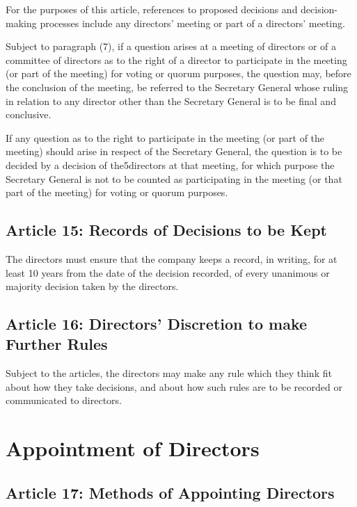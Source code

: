 \documentclass[letterpaper,10pt,openany,oneside,english]{sphinxmanual}
\begin{document}
 For the purposes of this article, references to proposed decisions and decision-making processes include any directors’ meeting or part of a directors’ meeting.

 Subject to paragraph (7), if a question arises at a meeting of directors or of a committee of directors as to the right of a director to participate in the meeting (or part of the meeting) for voting or quorum purposes, the question may, before the conclusion of the meeting, be referred to the Secretary General whose ruling in relation to any director other than the Secretary General is to be final and conclusive.

 If any question as to the right to participate in the meeting (or part of the meeting) should arise in respect of the Secretary General, the question is to be decided by a decision of the5directors at that meeting, for which purpose the Secretary General is not to be counted as participating in the meeting (or that part of the meeting) for voting or quorum purposes.


\subsection{Article 15: Records of Decisions to be Kept}
\label{\detokenize{directors:article-15-records-of-decisions-to-be-kept}}\label{\detokenize{directors:article-15}}
The directors must ensure that the company keeps a record, in writing, for at least 10 years from the date of the decision recorded, of every unanimous or majority decision taken by the directors.


\subsection{Article 16: Directors’ Discretion to make Further Rules}
\label{\detokenize{directors:article-16-directors-discretion-to-make-further-rules}}\label{\detokenize{directors:article-16}}
Subject to the articles, the directors may make any rule which they think fit about how they take decisions, and about how such rules are to be recorded or communicated to directors.


\section{Appointment of Directors}
\label{\detokenize{directors:appointment-of-directors}}

\subsection{Article 17: Methods of Appointing Directors}
\label{\detokenize{directors:article-17-methods-of-appointing-directors}}\label{\detokenize{directors:article-17}}
\end{document}
